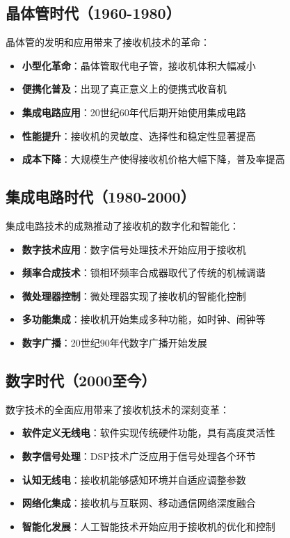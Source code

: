 \documentclass[12pt,UTF8]{ctexbook}
\begin{document}
\subsection{晶体管时代（1960-1980）}

晶体管的发明和应用带来了接收机技术的革命：

\begin{itemize}[leftmargin=3.5em]
    \item \textbf{小型化革命}：晶体管取代电子管，接收机体积大幅减小
    \item \textbf{便携化普及}：出现了真正意义上的便携式收音机
    \item \textbf{集成电路应用}：20世纪60年代后期开始使用集成电路
    \item \textbf{性能提升}：接收机的灵敏度、选择性和稳定性显著提高
    \item \textbf{成本下降}：大规模生产使得接收机价格大幅下降，普及率提高
\end{itemize}

\subsection{集成电路时代（1980-2000）}

集成电路技术的成熟推动了接收机的数字化和智能化：

\begin{itemize}[leftmargin=3.5em]
    \item \textbf{数字技术应用}：数字信号处理技术开始应用于接收机
    \item \textbf{频率合成技术}：锁相环频率合成器取代了传统的机械调谐
    \item \textbf{微处理器控制}：微处理器实现了接收机的智能化控制
    \item \textbf{多功能集成}：接收机开始集成多种功能，如时钟、闹钟等
    \item \textbf{数字广播}：20世纪90年代数字广播开始发展
\end{itemize}

\subsection{数字时代（2000至今）}

数字技术的全面应用带来了接收机技术的深刻变革：

\begin{itemize}[leftmargin=3.5em]
    \item \textbf{软件定义无线电}：软件实现传统硬件功能，具有高度灵活性
    \item \textbf{数字信号处理}：DSP技术广泛应用于信号处理各个环节
    \item \textbf{认知无线电}：接收机能够感知环境并自适应调整参数
    \item \textbf{网络化集成}：接收机与互联网、移动通信网络深度融合
    \item \textbf{智能化发展}：人工智能技术开始应用于接收机的优化和控制
\end{itemize}
\end{document}
